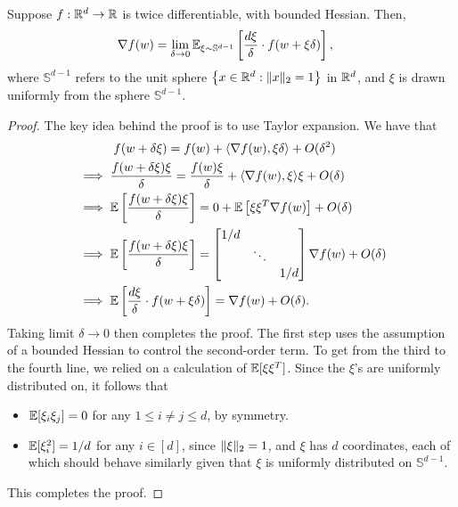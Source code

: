 \documentclass[11pt]{article}
\begin{document}
\begin{lemma}
Suppose $f: \mathbb{R}^d \to \mathbb{R}$ is twice differentiable, with bounded Hessian. Then,
\begin{align*}
    \nabla f(w) &= \lim_{\delta \to 0} \mathbb{E}_{\xi \sim \mathbb{S}^{d-1}} \left[ \dfrac{d\xi}{\delta} \cdot f(w + \xi \delta)  \right],
\end{align*}
where $\mathbb{S}^{d-1}$ refers to the unit sphere $\left\{x \in \mathbb{R}^d: \lVert x\rVert_2 = 1 \right\}$ in $\mathbb{R}^d$, and $\xi$ is drawn uniformly from the sphere $\mathbb{S}^{d-1}$.
\end{lemma}
\begin{proof}
The key idea behind the proof is to use Taylor expansion. We have that
\begin{alignat*}{2}
    & \quad \quad \quad f(w + \delta \xi) = f(w) + \langle\nabla f(w), \xi \delta\rangle + O(\delta^2) \\
    &\implies  \dfrac{f(w + \delta \xi) \xi}{\delta} = \dfrac{f(w) \xi}{\delta} + \langle\nabla f(w), \xi\rangle \xi + O(\delta) \\
    &\implies \mathbb{E} \left[ \dfrac{f(w + \delta \xi) \xi}{\delta}  \right] = 0 + \mathbb{E} \left[ \xi \xi^T \nabla f(w) \right] + O(\delta) \\
    &\implies \mathbb{E} \left[ \dfrac{f(w + \delta \xi) \xi}{\delta}  \right] = \begin{bmatrix} 
   1/d & & \\
    & \ddots & \\
    & & 1/d 
    \end{bmatrix}
    \nabla f(w) + O(\delta) \\
    &\implies \mathbb{E}\left[ \dfrac{d\xi}{\delta} \cdot f(w + \xi \delta) \right] = \nabla f(w) + O(\delta). 
\end{alignat*}
Taking limit $\delta \to 0$ then completes the proof. The first step uses the assumption of a bounded Hessian to control the second-order term. To get from the third to the fourth line, we relied on a calculation of $\mathbb{E}[\xi \xi^T]$. Since the $\xi$'s are uniformly distributed on, it follows that
\begin{itemize}
    \item $\mathbb{E}[\xi_i \xi_j]= 0$ for any $1 \leq i \neq j \leq d$, by symmetry.
    \item $\mathbb{E}[\xi_i^2] = 1/d$ for any $i \in [d]$, since $\lVert\xi\rVert_2 = 1$, and $\xi$ has $d$ coordinates, each of which should behave similarly given that $\xi$ is uniformly distributed on $\mathbb{S}^{d-1}$. 
\end{itemize}
This completes the proof. 
\end{proof}
\end{document}
